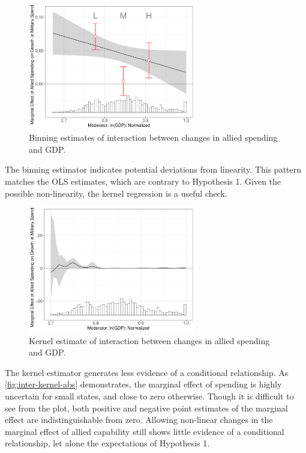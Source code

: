 \documentclass[12pt]{article}
\begin{document}
\begin{figure}
	\centering
		\includegraphics[width=0.65\textwidth]{inter-bin-abs.pdf}
		\caption{Binning estimates of interaction between changes in allied spending and GDP.}
	\label{fig:inter-bin-abs}
\end{figure}


The binning estimator indicates potential deviations from linearity. 
This pattern matches the OLS estimates, which are contrary to Hypothesis 1. 
Given the possible non-linearity, the kernel regression is a useful check. 


\begin{figure}
	\centering
		\includegraphics[width=0.65\textwidth]{inter-kernel-abs.pdf}
	\caption{Kernel estimate of interaction between changes in allied spending and GDP.}
	\label{fig:inter-kernel-abs}
\end{figure}


The kernel estimator generates less evidence of a conditional relationship. 
As \autoref{fig:inter-kernel-abs} demonstrates, the marginal effect of spending is highly uncertain for small states, and close to zero otherwise. 
Though it is difficult to see from the plot, both positive and negative point estimates of the marginal effect are indistinguishable from zero. 
Allowing non-linear changes in the marginal effect of allied capability still shows little evidence of a conditional relationship, let alone the expectations of Hypothesis 1. 
\end{document}
